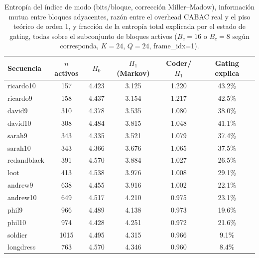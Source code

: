         \begin{table}[H]
            \centering
            \caption{Entropía del índice de modo (bits/bloque, corrección Miller--Madow),
            información mutua entre bloques adyacentes, razón entre el overhead CABAC real y el
            piso teórico de orden 1, y fracción de la entropía total explicada por el estado de
            gating, todas sobre el subconjunto de bloques activos ($B_c=16$ o $B_c=8$ según
            corresponda, $K=24$, $Q=24$, frame\_idx=1).}
            \begin{tabular}{l|c|c|c|c|c}
                \hline
                \textbf{Secuencia} & \textbf{$n$ activos} & $H_0$ & $H_1$ (Markov) &
                \textbf{Coder/$H_1$} & \textbf{Gating explica} \\
                \hline
                ricardo10    &  157 & 4.423 & 3.125 & 1.220 & 43.2\% \\
                ricardo9     &  158 & 4.437 & 3.154 & 1.217 & 42.5\% \\
                david9       &  310 & 4.378 & 3.535 & 1.080 & 38.0\% \\
                david10      &  308 & 4.484 & 3.815 & 1.048 & 41.1\% \\
                sarah9       &  343 & 4.335 & 3.521 & 1.079 & 37.4\% \\
                sarah10      &  343 & 4.366 & 3.676 & 1.065 & 37.5\% \\
                redandblack  &  391 & 4.570 & 3.884 & 1.027 & 26.5\% \\
                loot         &  413 & 4.538 & 3.976 & 1.008 & 29.1\% \\
                andrew9      &  638 & 4.455 & 3.916 & 1.002 & 22.1\% \\
                andrew10     &  649 & 4.517 & 4.210 & 0.975 & 23.1\% \\
                phil9        &  966 & 4.489 & 4.138 & 0.973 & 19.6\% \\
                phil10       &  974 & 4.428 & 4.251 & 0.972 & 21.6\% \\
                soldier      & 1015 & 4.495 & 4.315 & 0.966 &  9.1\% \\
                longdress    &  763 & 4.570 & 4.346 & 0.960 &  8.4\% \\
                \hline
            \end{tabular}
            \label{tab:e10_info_theory}
        \end{table}

